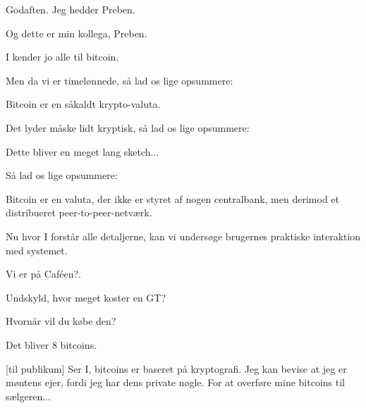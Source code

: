 \documentclass[a4paper,11pt]{article}
\begin{document}
\begin{sketch}


 Godaften. Jeg hedder Preben.


 Og dette er min kollega, Preben.


 I kender jo alle til bitcoin.

 Men da vi er timelønnede, så lad os lige opsummere:

 Bitcoin er en såkaldt krypto-valuta.

 Det lyder måske lidt kryptisk, så lad os lige opsummere:

 Dette bliver en meget lang sketch...

 Så lad os lige opsummere:

 Bitcoin er en valuta, der ikke er styret af nogen centralbank, men
derimod et distribueret peer-to-peer-netværk.

 Nu hvor I forstår alle detaljerne, kan vi undersøge brugernes praktiske
interaktion med systemet.

 Vi er på Caféen?.



 Undskyld, hvor meget koster en GT?


 Hvornår vil du købe den?




 Det bliver 8 bitcoins.

[til publikum] Ser I, bitcoins er baseret på kryptografi. Jeg kan
bevise at jeg er møntens ejer, fordi jeg har dens private nøgle. For at
overføre mine bitcoins til sælgeren...



\end{sketch}
\end{document}
